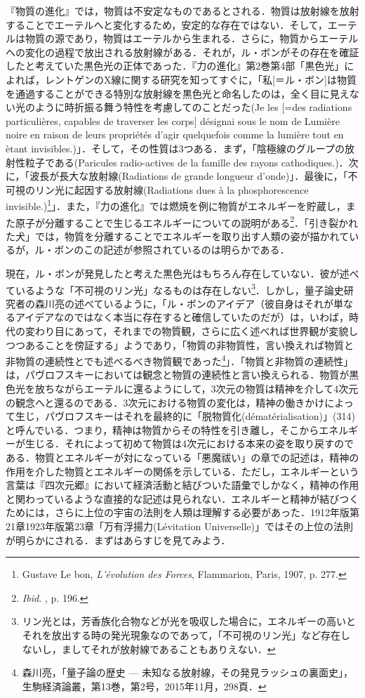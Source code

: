 『物質の進化』では，物質は不安定なものであるとされる．物質は放射線を放射することでエーテルへと変化するため，安定的な存在ではない．そして，エーテルは物質の源であり，物質はエーテルから生まれる．さらに，物質からエーテルへの変化の過程で放出される放射線がある．それが，ル・ボンがその存在を確証したと考えていた黒色光の正体であった．『力の進化』第2巻第4部「黒色光」によれば，レントゲンのX線に関する研究を知ってすぐに，「私[＝ル・ボン]は物質を通過することができる特別な放射線を黒色光と命名したのは，全く目に見えない光のように時折振る舞う特性を考慮してのことだった(Je les [=des radiations particulières, capables de traverser les corps] désignai sous le nom de Lumière noire en raison de leurs propriétés d'agir quelquefois comme la lumière tout en ètant invisibles.)」．そして，その性質は3つある．まず，「陰極線のグループの放射性粒子である(Paricules radio-actives de la famille des rayons cathodiques.)．次に，「波長が長大な放射線(Radiations de grande longueur d'onde)」．最後に，「不可視のリン光に起因する放射線(Radiations dues à la phosphorescence invisible.)\footnote{Gustave Le bon, \emph{L'évolution des Forces}, Flammarion, Paris, 1907, p. 277.}」．また，『力の進化』では燃焼を例に物質がエネルギーを貯蔵し，また原子が分離することで生じるエネルギーについての説明がある\footnote{\emph{Ibid. }, p. 196.}．「引き裂かれた犬」では，物質を分離することでエネルギーを取り出す人類の姿が描かれているが，ル・ボンのこの記述が参照されているのは明らかである．

現在，ル・ボンが発見したと考えた黒色光はもちろん存在していない．彼が述べているような「不可視のリン光」なるものは存在しない\footnote{リン光とは，芳香族化合物などが光を吸収した場合に，エネルギーの高いとそれを放出する時の発光現象なのであって，「不可視のリン光」など存在しないし，ましてそれが放射線であることもありえない．}．しかし，量子論史研究者の森川亮の述べているように，「ル・ボンのアイデア（彼自身はそれが単なるアイデアなのではなく本当に存在すると確信していたのだが）は，いわば，時代の変わり目にあって，それまでの物質観，さらに広く述べれば世界観が変貌しつつあることを傍証する」ようであり，「物質の非物質性，言い換えれば物質と非物質の連続性とでも述べるべき物質観であった\footnote{森川亮，「量子論の歴史 --- 未知なる放射線，その発見ラッシュの裏面史」，生駒経済論叢，第13巻，第2号，2015年11月，298頁．}」．「物質と非物質の連続性」は，パヴロフスキーにおいては観念と物質の連続性と言い換えられる．物質が黒色光を放ちながらエーテルに還るようにして，3次元の物質は精神を介して4次元の観念へと還るのである．3次元における物質の変化は，精神の働きかけによって生じ，パヴロフスキーはそれを最終的に「脱物質化(dématérialisation)」(314)と呼んでいる．つまり，精神は物質からその特性を引き離し，そこからエネルギーが生じる．それによって初めて物質は4次元における本来の姿を取り戻すのである．物質とエネルギーが対になっている「悪魔祓い」の章での記述は，精神の作用を介した物質とエネルギーの関係を示している．ただし，エネルギーという言葉は『四次元郷』において経済活動と結びついた語彙でしかなく，精神の作用と関わっているような直接的な記述は見られない．エネルギーと精神が結びつくためには，さらに上位の宇宙の法則を人類は理解する必要があった．1912年版第21章1923年版第23章「万有浮揚力(Lévitation Universelle)」ではその上位の法則が明らかにされる．まずはあらすじを見てみよう．

